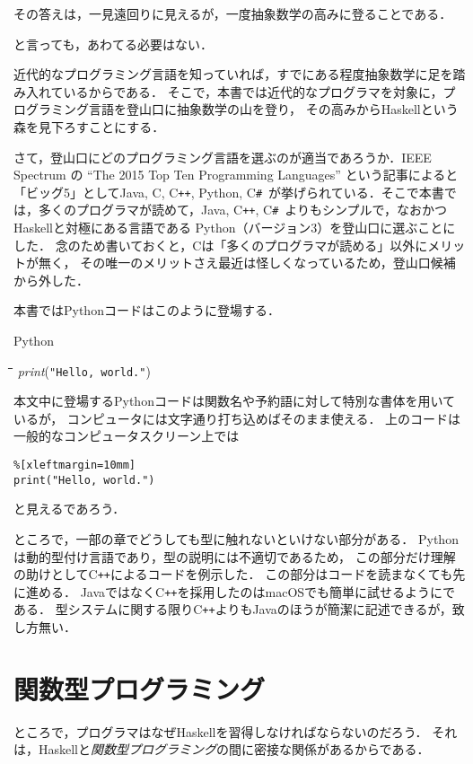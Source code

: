 \documentclass[twocolumn]{jsbook}
\newcommand{\programminglanguage}[1]{\textsf{#1}}
\newcommand{\clang}{\programminglanguage{C}}
\newcommand{\csharp}{\programminglanguage{C}\texttt{\#}}
\newcommand{\cxx}{\programminglanguage{C}\texttt{++}}
\newcommand{\haskell}{\programminglanguage{Haskell}}
\newcommand{\java}{\programminglanguage{Java}}
\newcommand{\python}{\programminglanguage{Python}}
\newcommand{\keyword}[1]{{\emph{#1}}}
\newenvironment{pythoncode}{\begin{itembox}[r]{\python}}{\end{itembox}}
\newenvironment{pythontab}{\begin{tabbing}\hspace*{1em}\=\hspace*{1em}\=\hspace*{1em}\=\hspace*{1em}\=\kill}{\end{tabbing}}
\newcommand{\pthnId}[1]{\textit{#1}}
\newcommand{\pthnString}[1]{\texttt{#1}}
\begin{document}
その答えは，一見遠回りに見えるが，一度抽象数学の高みに登ることである．

と言っても，あわてる必要はない．

近代的なプログラミング言語を知っていれば，すでにある程度抽象数学に足を踏み入れているからである．
そこで，本書では近代的なプログラマを対象に，プログラミング言語を登山口に抽象数学の山を登り，
その高みから\haskell という森を見下ろすことにする．

さて，登山口にどのプログラミング言語を選ぶのが適当であろうか．IEEE Spectrum の ``The 2015
Top Ten Programming Languages'' という記事によると「ビッグ5」として\java, \clang,
\cxx, \python, \csharp\ が挙げられている．そこで本書では，多くのプログラマが読めて，\java,
\cxx, \csharp\ よりもシンプルで，なおかつ\haskell と対極にある言語である
\python（バージョン3）を登山口に選ぶことにした．
念のため書いておくと，\clang は「多くのプログラマが読める」以外にメリットが無く，
その唯一のメリットさえ最近は怪しくなっているため，登山口候補から外した．

本書では\python コードはこのように登場する．
\begin{pythoncode}
\begin{pythontab}
\pthnId{print}(\pthnString{"Hello, world."})
\end{pythontab}
\end{pythoncode}
本文中に登場する\python コードは関数名や予約語に対して特別な書体を用いているが，
コンピュータには文字通り打ち込めばそのまま使える．
上のコードは一般的なコンピュータスクリーン上では
\begin{verbatim}%[xleftmargin=10mm]
print("Hello, world.")
\end{verbatim}
と見えるであろう．

ところで，一部の章でどうしても型に触れないといけない部分がある．
\python は動的型付け言語であり，型の説明には不適切であるため，
この部分だけ理解の助けとして\cxx によるコードを例示した．
この部分はコードを読まなくても先に進める．
\java ではなく\cxx を採用したのはmacOSでも簡単に試せるようにである．
型システムに関する限り\cxx よりも\java のほうが簡潔に記述できるが，致し方無い．

\section{関数型プログラミング}

ところで，プログラマはなぜ\haskell を習得しなければならないのだろう．
それは，\haskell と\keyword{関数型プログラミング}の間に密接な関係があるからである．
\end{document}
